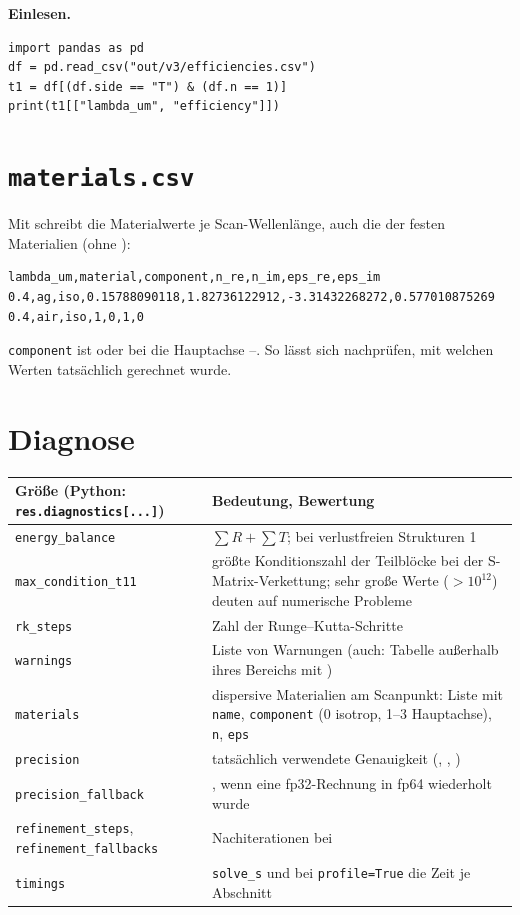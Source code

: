 \textbf{Einlesen.}
\begin{lstlisting}[style=py]
import pandas as pd
df = pd.read_csv("out/v3/efficiencies.csv")
t1 = df[(df.side == "T") & (df.n == 1)]
print(t1[["lambda_um", "efficiency"]])
\end{lstlisting}

\section{\texttt{materials.csv}}\label{sec:materials-csv}
%
Mit  schreibt  die Materialwerte je
Scan-Wellenlänge, auch die der festen Materialien (ohne ):
\begin{lstlisting}
lambda_um,material,component,n_re,n_im,eps_re,eps_im
0.4,ag,iso,0.15788090118,1.82736122912,-3.31432268272,0.577010875269
0.4,air,iso,1,0,1,0
\end{lstlisting}
\texttt{component} ist  oder bei  die Hauptachse --. So lässt sich
nachprüfen, mit welchen Werten tatsächlich gerechnet wurde.

\section{Diagnose}\label{sec:diagnose}
%
\begin{center}
\small
\begin{tabularx}{\linewidth}{lY}
\toprule
Größe (Python: \texttt{res.diagnostics[...]}) & Bedeutung, Bewertung \\
\midrule
\texttt{energy\_balance} & $\sum R + \sum T$; bei verlustfreien Strukturen 1 \\
\texttt{max\_condition\_t11} & größte Konditionszahl der Teilblöcke bei der S-Matrix-Verkettung; sehr große Werte
($>10^{12}$) deuten auf numerische Probleme \\
\texttt{rk\_steps} & Zahl der Runge--Kutta-Schritte \\
\texttt{warnings} & Liste von Warnungen (auch: Tabelle außerhalb ihres Bereichs mit ) \\
\texttt{materials} & dispersive Materialien am Scanpunkt: Liste mit \texttt{name}, \texttt{component} (0 isotrop,
1--3 Hauptachse), \texttt{n}, \texttt{eps} \\
\texttt{precision} & tatsächlich verwendete Genauigkeit (, , ) \\
\texttt{precision\_fallback} & , wenn eine fp32-Rechnung in fp64 wiederholt wurde \\
\texttt{refinement\_steps}, \texttt{refinement\_fallbacks} & Nachiterationen bei  \\
\texttt{timings} & \texttt{solve\_s} und bei \texttt{profile=True} die Zeit je Abschnitt \\
\bottomrule
\end{tabularx}
\end{center}


